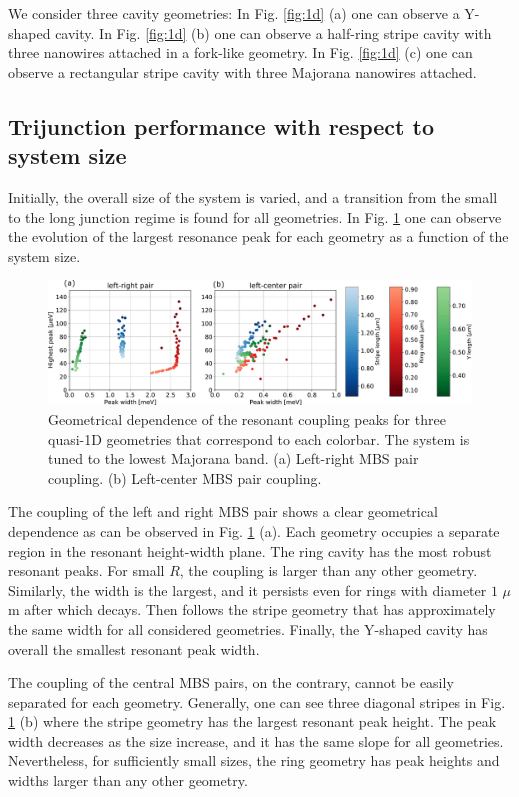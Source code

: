 We consider three cavity geometries:
In Fig. \ref{fig:1d} (a) one can observe a Y-shaped cavity. 
In Fig. \ref{fig:1d} (b) one can observe a half-ring stripe cavity with three nanowires attached in a fork-like geometry. 
In Fig. \ref{fig:1d} (c) one can observe a rectangular stripe cavity with three Majorana nanowires attached.

\subsection{Trijunction performance with respect to system size}

Initially, the overall size of the system is varied, and a transition from the small to the long junction regime is found for all geometries.
In Fig. \ref{fig:1d_results} one can observe the evolution of the largest resonance peak for each geometry as a function of the system size.

\begin{figure}[h!]
\centering
  \includegraphics[width=\linewidth]{figures/couplings_1d.pdf}
  \caption{Geometrical dependence of the resonant coupling peaks for three quasi-1D geometries that correspond to each colorbar. The system is tuned to the lowest Majorana band. (a) Left-right MBS pair coupling. (b) Left-center MBS pair coupling.}
  \label{fig:1d_results}
\end{figure}

The coupling of the left and right MBS pair shows a clear geometrical dependence as can be observed in Fig. \ref{fig:1d_results} (a).
Each geometry occupies a separate region in the resonant height-width plane.
The ring cavity has the most robust resonant peaks.
For small $R$, the coupling is larger than any other geometry.
Similarly, the width is the largest, and it persists even for rings with diameter $1$ $\mu$m after which decays.
Then follows the stripe geometry that has approximately the same width for all considered geometries.
Finally, the Y-shaped cavity has overall the smallest resonant peak width. 

The coupling of the central MBS pairs, on the contrary, cannot be easily separated for each geometry.
Generally, one can see three diagonal stripes in Fig. \ref{fig:1d_results} (b) where the stripe geometry has the largest resonant peak height.
The peak width decreases as the size increase, and it has the same slope for all geometries.
Nevertheless, for sufficiently small sizes, the ring geometry has peak heights and widths larger than any other geometry.

